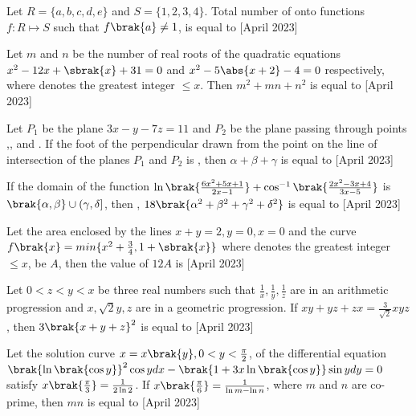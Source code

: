 \iffalse
\title{April 2023, Shift - 2}
\author{EE24BTECH11062}	
\section{integer}
\fi
\item Let $R=\{a,b,c,d,e\}$ and $S=\{1,2,3,4\}$. Total number of onto functions $f: R\mapsto S$ such that $f\brak{a}\neq 1$, is equal to \hfill{[April 2023]}

\item Let $m$ and $n$ be the number of real roots of the quadratic equations $x^2-12x+\sbrak{x}+31=0$ and $x^2-5\abs{x+2}-4=0$ respectively, where  denotes the greatest integer $\leq x$. Then $m^2+mn+n^2$ is equal to \hfill{[April 2023]}

\item Let $P_1$ be the plane $3x-y-7z=11$ and $P_2$ be the plane passing through points ,, and . If the foot of the perpendicular drawn from the point  on the line of intersection of the planes $P_1$ and $P_2$ is \brak{\alpha,\beta,\gamma}, then $\alpha+\beta+\gamma$ is equal to \hfill{[April 2023]}

\item If the domain of the function $\ln \brak{\frac{6x^2+5x+1}{2x-1}}+\cos^{-1}\brak{\frac{2x^2-3x+4}{3x-5}}$ is $\brak{\alpha,\beta}\cup(\gamma,\delta]$, then , $18\brak{\alpha^2+\beta^2+\gamma^2+\delta^2}$ is equal to \hfill{[April 2023]}

\item Let the area enclosed by the lines $x+y=2, y=0, x=0$ and the curve $f\brak{x}=min\{x^2+\frac{3}{4},1+\sbrak{x}\}$ where  denotes the greatest integer $\leq x$, be $A$, then the value of $12A$ is \hfill{[April 2023]}

\item Let $0<z<y<x$ be three real numbers such that $\frac{1}{x},\frac{1}{y}, \frac{1}{z}$ are in an arithmetic progression and $x,\sqrt{2}y, z$ are in a geometric progression. If $xy+yz+zx=\frac{3}{\sqrt{2}}xyz$, then $3\brak{x+y+z}^2$ is equal to \hfill{[April 2023]}

\item Let the solution curve $x=x\brak{y}, 0<y<\frac{\pi}{2}$, of the differential equation $\brak{\ln\brak{\cos y}}^2\cos y dx-\brak{1+3x\ln \brak{\cos y}}\sin y dy =0$ satisfy $x\brak{\frac{\pi}{3}}=\frac{1}{2\ln 2}$. If $x\brak{\frac{\pi}{6}}=\frac{1}{\ln m-\ln n}$, where $m$ and $n$ are co-prime, then $mn$ is equal to  \hfill{[April 2023]}

